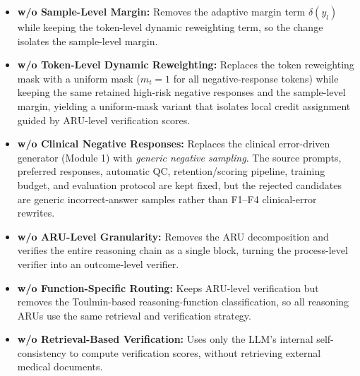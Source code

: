 \documentclass[a4paper,fleqn,doubleblind]{cas-sc}
\begin{document}
\begin{itemize}[leftmargin=*]
    \item \textbf{w/o Sample-Level Margin:} Removes the adaptive margin term $\delta(y_l)$ while keeping the token-level dynamic reweighting term, so the change isolates the sample-level margin.
    \item \textbf{w/o Token-Level Dynamic Reweighting:} Replaces the token reweighting mask with a uniform mask ($m_t = 1$ for all negative-response tokens) while keeping the same retained high-risk negative responses and the sample-level margin, yielding a uniform-mask variant that isolates local credit assignment guided by ARU-level verification scores.
    \item \textbf{w/o Clinical Negative Responses:} Replaces the clinical error-driven generator (Module 1) with \textit{generic negative sampling}. The source prompts, preferred responses, automatic QC, retention/scoring pipeline, training budget, and evaluation protocol are kept fixed, but the rejected candidates are generic incorrect-answer samples rather than F1--F4 clinical-error rewrites.
    \item \textbf{w/o ARU-Level Granularity:} Removes the ARU decomposition and verifies the entire reasoning chain as a single block, turning the process-level verifier into an outcome-level verifier.
    \item \textbf{w/o Function-Specific Routing:} Keeps ARU-level verification but removes the Toulmin-based reasoning-function classification, so all reasoning ARUs use the same retrieval and verification strategy.
    \item \textbf{w/o Retrieval-Based Verification:} Uses only the LLM's internal self-consistency to compute verification scores, without retrieving external medical documents.
\end{itemize}
\end{document}
